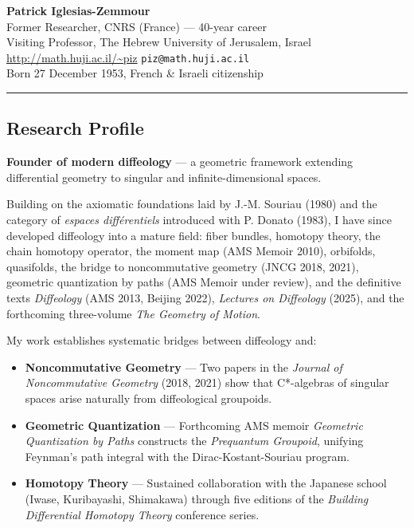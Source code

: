 \documentclass[11pt,reqno]{amsart}
\begin{document}
  
  \begin{center}
    {\LARGE\textbf{Patrick Iglesias-Zemmour}} \\ [1ex]
    Former Researcher, CNRS (France) — 40-year career \\
    Visiting Professor, The Hebrew University of Jerusalem, Israel \\ [1ex]
    \url{http://math.huji.ac.il/~piz} \quad \texttt{piz@math.huji.ac.il} \\ [1ex]
    Born 27 December 1953, French \& Israeli citizenship
  \end{center}
  
  \medskip\hrule\medskip
  
  
  \subsection*{Research Profile}
  
  \textbf{Founder of modern diffeology} — a geometric framework extending differential geometry to singular and infinite-dimensional spaces.
  
  Building on the axiomatic foundations laid by J.-M. Souriau (1980) and the category of \textit{espaces différentiels} introduced with P. Donato (1983), I have since developed diffeology into a mature field: fiber bundles, homotopy theory, the chain homotopy operator, the moment map (AMS Memoir 2010), orbifolds, quasifolds, the bridge to noncommutative geometry (JNCG 2018, 2021), geometric quantization by paths (AMS Memoir under review), and the definitive texts \textit{Diffeology} (AMS 2013, Beijing 2022), \textit{Lectures on Diffeology} (2025), and the forthcoming three-volume \textit{The Geometry of Motion}.
  
  My work establishes systematic bridges between diffeology and:
  
  \begin{itemize}
    \item \textbf{Noncommutative Geometry} — Two papers in the \emph{Journal of Noncommutative Geometry} (2018, 2021) show that C*-algebras of singular spaces arise naturally from diffeological groupoids.
    \item \textbf{Geometric Quantization} — Forthcoming AMS memoir \emph{Geometric Quantization by Paths} constructs the \emph{Prequantum Groupoid}, unifying Feynman's path integral with the Dirac-Kostant-Souriau program.
    \item \textbf{Homotopy Theory} — Sustained collaboration with the Japanese school (Iwase, Kuribayashi, Shimakawa) through five editions of the \emph{Building Differential Homotopy Theory} conference series.
  \end{itemize}
  
\end{document}
